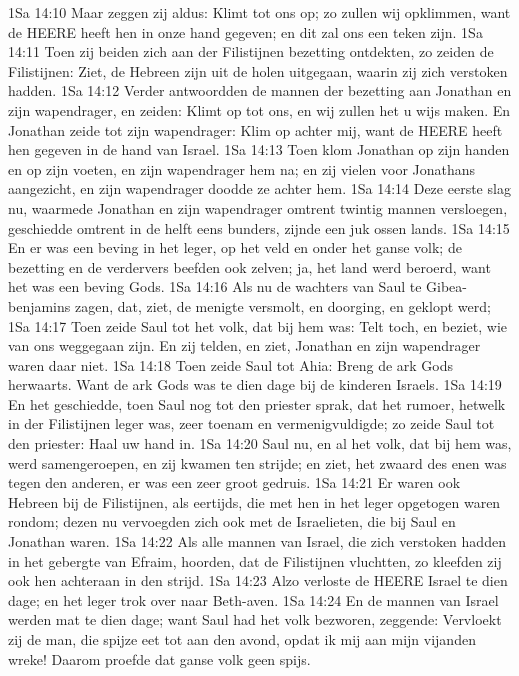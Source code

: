 1Sa 14:10  Maar zeggen zij aldus: Klimt tot ons op; zo zullen wij opklimmen, want de HEERE heeft hen in onze hand gegeven; en dit zal ons een teken zijn.
1Sa 14:11  Toen zij beiden zich aan der Filistijnen bezetting ontdekten, zo zeiden de Filistijnen: Ziet, de Hebreen zijn uit de holen uitgegaan, waarin zij zich verstoken hadden.
1Sa 14:12  Verder antwoordden de mannen der bezetting aan Jonathan en zijn wapendrager, en zeiden: Klimt op tot ons, en wij zullen het u wijs maken. En Jonathan zeide tot zijn wapendrager: Klim op achter mij, want de HEERE heeft hen gegeven in de hand van Israel.
1Sa 14:13  Toen klom Jonathan op zijn handen en op zijn voeten, en zijn wapendrager hem na; en zij vielen voor Jonathans aangezicht, en zijn wapendrager doodde ze achter hem.
1Sa 14:14  Deze eerste slag nu, waarmede Jonathan en zijn wapendrager omtrent twintig mannen versloegen, geschiedde omtrent in de helft eens bunders, zijnde een juk ossen lands.
1Sa 14:15  En er was een beving in het leger, op het veld en onder het ganse volk; de bezetting en de verdervers beefden ook zelven; ja, het land werd beroerd, want het was een beving Gods.
1Sa 14:16  Als nu de wachters van Saul te Gibea-benjamins zagen, dat, ziet, de menigte versmolt, en doorging, en geklopt werd;
1Sa 14:17  Toen zeide Saul tot het volk, dat bij hem was: Telt toch, en beziet, wie van ons weggegaan zijn. En zij telden, en ziet, Jonathan en zijn wapendrager waren daar niet.
1Sa 14:18  Toen zeide Saul tot Ahia: Breng de ark Gods herwaarts. Want de ark Gods was te dien dage bij de kinderen Israels.
1Sa 14:19  En het geschiedde, toen Saul nog tot den priester sprak, dat het rumoer, hetwelk in der Filistijnen leger was, zeer toenam en vermenigvuldigde; zo zeide Saul tot den priester: Haal uw hand in.
1Sa 14:20  Saul nu, en al het volk, dat bij hem was, werd samengeroepen, en zij kwamen ten strijde; en ziet, het zwaard des enen was tegen den anderen, er was een zeer groot gedruis.
1Sa 14:21  Er waren ook Hebreen bij de Filistijnen, als eertijds, die met hen in het leger opgetogen waren rondom; dezen nu vervoegden zich ook met de Israelieten, die bij Saul en Jonathan waren.
1Sa 14:22  Als alle mannen van Israel, die zich verstoken hadden in het gebergte van Efraim, hoorden, dat de Filistijnen vluchtten, zo kleefden zij ook hen achteraan in den strijd.
1Sa 14:23  Alzo verloste de HEERE Israel te dien dage; en het leger trok over naar Beth-aven.
1Sa 14:24  En de mannen van Israel werden mat te dien dage; want Saul had het volk bezworen, zeggende: Vervloekt zij de man, die spijze eet tot aan den avond, opdat ik mij aan mijn vijanden wreke! Daarom proefde dat ganse volk geen spijs.

